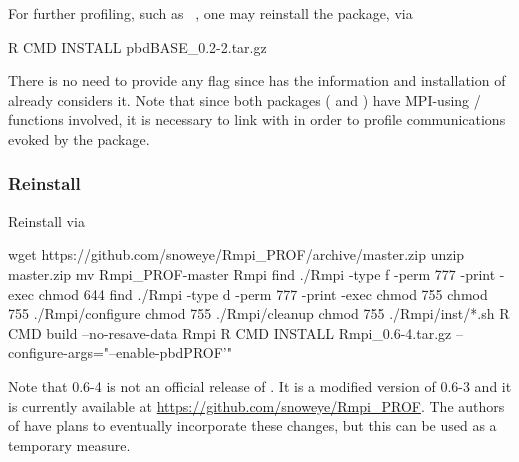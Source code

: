 For further profiling, such as ~\citep{Schmidt2012pbdBASEpackage}, one may
reinstall the package, via
\begin{Command}
R CMD INSTALL pbdBASE_0.2-2.tar.gz
\end{Command}
There is no need to provide any flag since  has the
information and installation of  already considers it.
Note that since both packages ( and )
have MPI-using / functions involved, it
is necessary to link with  in order to profile communications
evoked by the package.


\subsubsection{Reinstall }
\label{sec:Rmpi}

Reinstall  via
\begin{Command}
wget https://github.com/snoweye/Rmpi_PROF/archive/master.zip
unzip master.zip
mv Rmpi_PROF-master Rmpi
find ./Rmpi -type f -perm 777 -print -exec chmod 644 {} \;
find ./Rmpi -type d -perm 777 -print -exec chmod 755 {} \;
chmod 755 ./Rmpi/configure
chmod 755 ./Rmpi/cleanup
chmod 755 ./Rmpi/inst/*.sh
R CMD build --no-resave-data Rmpi
R CMD INSTALL Rmpi_0.6-4.tar.gz --configure-args="--enable-pbdPROF'"
\end{Command}
Note that {\color{red} 0.6-4} is not an official release of .
It is a modified version of 0.6-3 and it is currently available at
\url{https://github.com/snoweye/Rmpi_PROF}.  The authors of  have plans 
to eventually incorporate these changes, but this can be used as a temporary 
measure.
